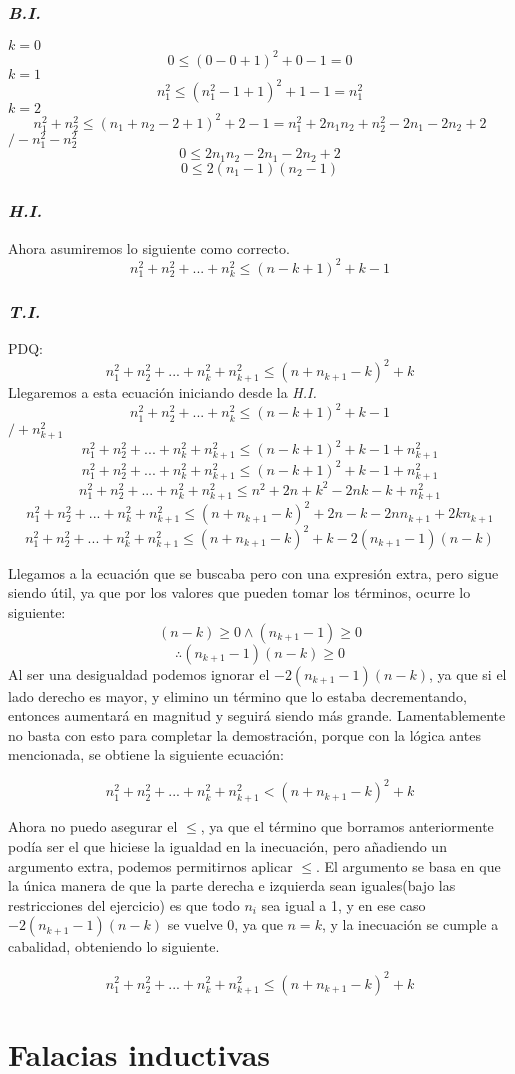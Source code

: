 \documentclass{article}
\begin{document}
\subsubsection*{\emph{B.I.}}
$k=0$
\[0 \leq (0 - 0 +1)^2 + 0 -1 = 0\]
$k=1$
\[ n_1^2 \leq (n_1^2 - 1 + 1)^2 + 1 - 1 = n_1^2\]
$k=2$
\[ n_1^2 + n_2^2 \leq (n_1 + n_2 - 2 + 1)^2 + 2 -1 = n_1^2 + 2n_1n_2+n_2^2-2n_1-2n_2+2 \]
\hspace*{0pt}\hfill $/ - n_1^2 - n_2^2$
\[ 0 \leq  2n_1n_2-2n_1-2n_2+2 \]
\[ 0 \leq 2(n_1 - 1)(n_2 - 1) \]
\subsubsection*{\emph{H.I.}}
Ahora asumiremos lo siguiente como correcto.
\[ n_1^2 + n_2^2 + ... + n_k^2 \leq (n-k+1)^2 + k -1\]

\subsubsection*{\emph{T.I.}}
PDQ:
\[ n_1^2 + n_2^2 + ... + n_k^2 + n_{k+1}^2 \leq (n + n_{k+1}-k)^2 + k\]
Llegaremos a esta ecuación iniciando desde la \emph{H.I.}
\[ n_1^2 + n_2^2 + ... + n_k^2 \leq (n-k+1)^2 + k -1\]
\hspace*{0pt}\hfill $/ + n_{k+1}^2 $
\[ n_1^2 + n_2^2 + ... + n_k^2 + n_{k+1}^2 \leq (n-k+1)^2 + k -1 +n_{k+1}^2\]
\[ n_1^2 + n_2^2 + ... + n_k^2 + n_{k+1}^2 \leq (n-k+1)^2 + k -1 +n_{k+1}^2\]
\[ n_1^2 + n_2^2 + ... + n_k^2 + n_{k+1}^2 \leq n^2 + 2n +k^2-2nk-k +n_{k+1}^2\]
\[ n_1^2 + n_2^2 + ... + n_k^2 + n_{k+1}^2 \leq (n + n_{k+1}-k)^2 + 2n-k-2nn_{k+1}+2kn_{k+1}\]
\[ n_1^2 + n_2^2 + ... + n_k^2 + n_{k+1}^2 \leq (n + n_{k+1}-k)^2 + k -2(n_{k+1} -1)(n-k) \]

Llegamos a la ecuación que se buscaba pero con una expresión extra, pero sigue siendo 
útil, ya que por los valores que pueden tomar los términos, ocurre lo siguiente:
\[ (n-k) \geq 0 \land (n_{k+1}-1) \geq 0 \]
\[ \therefore (n_{k+1}-1)(n-k) \geq 0 \]
Al ser una desigualdad podemos ignorar el $ -2(n_{k+1}-1)(n-k) $, ya que si el lado
derecho es mayor, y elimino un término que lo estaba decrementando, entonces 
aumentará en magnitud y seguirá siendo más grande. Lamentablemente no basta con 
esto para completar la demostración, porque con la lógica antes mencionada, se 
obtiene la siguiente ecuación:

\[ n_1^2 + n_2^2 + ... + n_k^2 + n_{k+1}^2 < (n + n_{k+1}-k)^2 + k \]

Ahora no puedo asegurar el $\leq$, ya que el término que borramos anteriormente
podía ser el que hiciese la igualdad en la inecuación, pero añadiendo un argumento 
extra, podemos permitirnos aplicar $\leq$. El argumento se basa en que la única 
manera de que la parte derecha e izquierda sean iguales(bajo las restricciones
del ejercicio) es que todo $n_{i}$ sea igual a 1, y en ese caso $ -2(n_{k+1}-1)(n-k) $
se vuelve 0, ya que $n=k$, y la inecuación se cumple a cabalidad, obteniendo lo 
siguiente.

\[ n_1^2 + n_2^2 + ... + n_k^2 + n_{k+1}^2 \leq (n + n_{k+1}-k)^2 + k \]


\section{Falacias inductivas}
\end{document}

